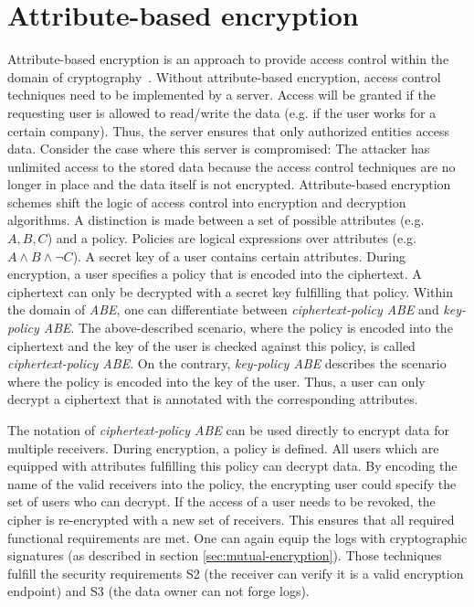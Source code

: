 \documentclass[../main.tex]{subfiles}
\begin{document}
\section{Attribute-based encryption}

Attribute-based encryption is an approach to provide access control within the domain of cryptography~\cite{Bethencourt2007}. 
Without attribute-based encryption, access control techniques need to be implemented by a server. 
Access will be granted if the requesting user is allowed to read/write the data (e.g. if the user works for a certain company). 
Thus, the server ensures that only authorized entities access data. 
Consider the case where this server is compromised: 
The attacker has unlimited access to the stored data because the access control techniques are no longer in place and the data itself is not encrypted.
Attribute-based encryption schemes shift the logic of access control into encryption and decryption algorithms. 
A distinction is made between a set of possible attributes (e.g. ${A,B,C}$) and a policy. 
Policies are logical expressions over attributes (e.g. $A \land B \land \neg C$). 
A secret key of a user contains certain attributes. 
During encryption, a user specifies a policy that is encoded into the ciphertext.
A ciphertext can only be decrypted with a secret key fulfilling that policy.
Within the domain of \textit{ABE}, one can differentiate between \textit{ciphertext-policy ABE} and \textit{key-policy ABE}. 
The above-described scenario, where the policy is encoded into the ciphertext and the key of the user is checked against this policy, is called \textit{ciphertext-policy ABE}. 
On the contrary, \textit{key-policy ABE} describes the scenario where the policy is encoded into the key of the user.
Thus, a user can only decrypt a ciphertext that is annotated with the corresponding attributes.~\cite{Bethencourt2007}

The notation of \textit{ciphertext-policy ABE} can be used directly to encrypt data for multiple receivers. 
During encryption, a policy is defined. 
All users which are equipped with attributes fulfilling this policy can decrypt data.
By encoding the name of the valid receivers into the policy, the encrypting user could specify the set of users who can decrypt.
If the access of a user needs to be revoked, the cipher is re-encrypted with a new set of receivers.
This ensures that all required functional requirements are met.
One can again equip the logs with cryptographic signatures (as described in section \ref{sec:mutual-encryption}).
Those techniques fulfill the security requirements S2 (the receiver can verify it is a valid encryption endpoint) and S3 (the data owner can not forge logs).
\end{document}
